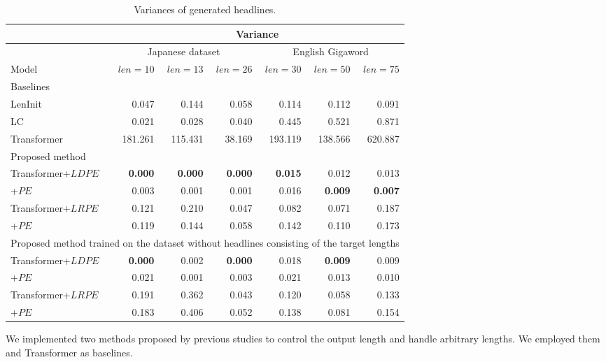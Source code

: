 \documentclass[11pt,a4paper]{article}
\begin{document}
\begin{table*}[!t]
  \centering
  \footnotesize
  \begin{tabular}{| l | r r r | r r r |} \hline
  & \multicolumn{6}{c|}{Variance} \\ \hline
  & \multicolumn{3}{c|}{Japanese dataset} & \multicolumn{3}{c|}{English Gigaword} \\ \hline
  Model & $len = 10$ & $len = 13$ & $len = 26$ & $len = 30$ & $len = 50$ & $len = 75$ \\ \hline
  \multicolumn{7}{|l|}{Baselines} \\ \hline
  LenInit & 0.047 & 0.144 & 0.058 & 0.114 & 0.112 & 0.091 \\
  LC & 0.021 & 0.028 & 0.040 & 0.445 & 0.521 & 0.871 \\
  Transformer & 181.261 & 115.431 & 38.169 & 193.119 & 138.566 & 620.887 \\ \hline
  \multicolumn{7}{|l|}{Proposed method} \\ \hline
  Transformer+$LDPE$ & {\bf 0.000} & {\bf 0.000} & {\bf 0.000} & {\bf 0.015} & 0.012 & 0.013 \\
  +$PE$ & 0.003 & 0.001 & 0.001 & 0.016 & {\bf 0.009} & {\bf 0.007} \\
  Transformer+$LRPE$ & 0.121 & 0.210 & 0.047 & 0.082 & 0.071 & 0.187 \\
  +$PE$ & 0.119 & 0.144 & 0.058 & 0.142 & 0.110 & 0.173 \\ \hline
  \multicolumn{7}{|l|}{Proposed method trained on the dataset without headlines consisting of the target lengths} \\ \hline
  Transformer+$LDPE$ & {\bf 0.000} & 0.002 & {\bf 0.000} & 0.018 & {\bf 0.009} & 0.009 \\
  +$PE$ & 0.021 & 0.001 & 0.003 & 0.021 & 0.013 & 0.010 \\
  Transformer+$LRPE$ & 0.191 & 0.362 & 0.043 & 0.120 & 0.058 & 0.133 \\
  +$PE$ & 0.183 & 0.406 & 0.052 & 0.138 & 0.081 & 0.154 \\ \hline
  \end{tabular}
  \caption{Variances of generated headlines.\label{tab:var_length}}
\end{table*}

We implemented two methods proposed by previous studies to control the output length and handle arbitrary lengths.
We employed them and Transformer as baselines.
\end{document}
